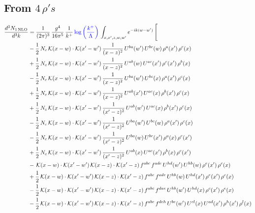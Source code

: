 \documentclass[9pt]{article}
\numberwithin{equation}{section}
\begin{document}
\subsection{From $4\, \rho's$}
\begin{align}
\frac{d^{3}N_{1\,\mathrm{NLO}}}{d^{3}k} & = \frac{1}{(2\pi)^{3}}\,\frac{g^{4}}{16\pi^{5}}\,\frac{1}{k^{+}}\,{\color{blue}\log{\left(\frac{k^{+}}{\Lambda}\right)}}\,\int_{x,x',z,w,w'}e^{-ik(w-w')}\,\Bigg[\notag\\ & -\frac{1}{2}\,N_{c}\,\mathcal{K}(x-w)\cdot\mathcal{K}(x'-w')\,\frac{1}{(x-z)^{2}}\,U^{ba}(w')\,U^{bc}(w)\,\rho^{a}(x')\,\rho^{c}(x)\notag\\
& +\frac{1}{2}\,N_{c}\,\mathcal{K}(x-w)\cdot\mathcal{K}(x'-w')\,\frac{1}{(x-z)^{2}}\,U^{ab}(w)\,U^{ac}(x')\,\rho^{c}(x')\,\rho^{b}(x)\notag\\
& -\frac{1}{2}\,N_{c}\,\mathcal{K}(x-w)\cdot\mathcal{K}(x'-w')\,\frac{1}{(x-z)^{2}}\,U^{ba}(w')\,U^{bc}(x)\,\rho^{a}(x')\,\rho^{c}(x)\notag\\
& +\frac{1}{2}\,N_{c}\,\mathcal{K}(x-w)\cdot\mathcal{K}(x'-w')\,\frac{1}{(x-z)^{2}}\,U^{ab}(x')\,U^{ac}(x)\,\rho^{b}(x')\,\rho^{c}(x)\notag\\
& +\frac{1}{2}\,N_{c}\,\mathcal{K}(x-w)\cdot\mathcal{K}(x'-w')\,\frac{1}{(x'-z)^{2}}\,U^{ab}(w')\,U^{ac}(x)\,\rho^{b}(x')\,\rho^{c}(x)\notag\\
& -\frac{1}{2}\,N_{c}\,\mathcal{K}(x-w)\cdot\mathcal{K}(x'-w')\,\frac{1}{(x'-z)^{2}}\,U^{ba}(w')\,U^{bc}(w)\,\rho^{a}(x')\,\rho^{c}(x)\notag\\
& -\frac{1}{2}\,N_{c}\,\mathcal{K}(x-w)\cdot\mathcal{K}(x'-w')\,\frac{1}{(x'-z)^{2}}\,U^{ba}(w)\,U^{bc}(x')\,\rho^{a}(x)\,\rho^{c}(x')\notag\\
& +\frac{1}{2}\,N_{c}\,\mathcal{K}(x-w)\cdot\mathcal{K}(x'-w')\,\frac{1}{(x'-z)^{2}}\,U^{ab}(x)\,U^{ac}(x')\,\rho^{b}(x)\,\rho^{c}(x')\notag\\
& -\,\mathcal{K}(x-w)\cdot\mathcal{K}(x'-w')\,\mathcal{K}(x-z)\cdot\mathcal{K}(x'-z)\,f^{abc}\,f^{ade}\,U^{hd}(w')\,U^{hb}(w)\,\rho^{e}(x')\,\rho^{c}(x)\notag\\
& +\frac{1}{2}\,\mathcal{K}(x-w)\cdot\mathcal{K}(x'-w')\,\mathcal{K}(x-z)\cdot\mathcal{K}(x'-z)\,f^{abc}\,f^{ade}\,U^{hb}(w)\,U^{hd}(x')\,\rho^{e}(x')\,\rho^{c}(x)\notag\\
& -\frac{1}{2}\,\mathcal{K}(x-w)\cdot\mathcal{K}(x'-w')\,\mathcal{K}(x-z)\cdot\mathcal{K}(x'-z)\,f^{abc}\,f^{dae}\,U^{hb}(w')\,U^{hd}(x)\,\rho^{c}(x')\,\rho^{e}(x)\notag\\
& -\frac{1}{2}\,\mathcal{K}(x-w)\cdot\mathcal{K}(x'-w')\,\mathcal{K}(x-z)\cdot\mathcal{K}(x'-z)\,f^{abc}\,f^{deh}\,U^{be}(w')\,U^{cl}(x)\,U^{ad}(x')\,\rho^{h}(x')\,\rho^{l}(x)\notag\\

\end{align}
\end{document}
